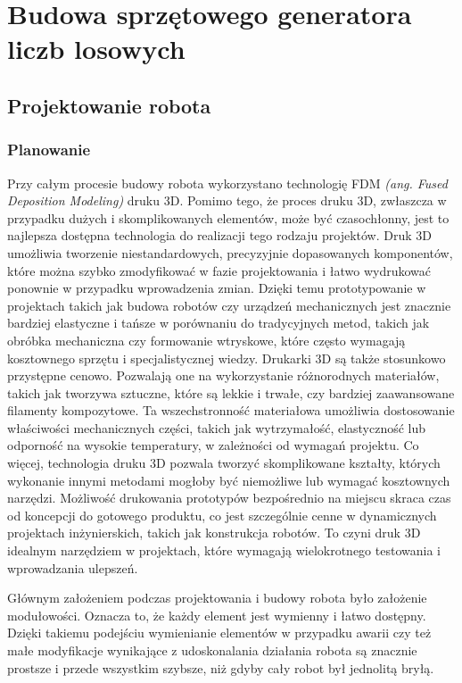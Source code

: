 
\chapter{Budowa sprzętowego generatora liczb losowych}\label{ch:budowa-sprzetowego-generatora}


\section{Projektowanie robota}\label{sec:projektowanie-robota}

\subsection{Planowanie}\label{subsec:Planowanie}

Przy całym procesie budowy robota wykorzystano technologię FDM \textit{(ang. Fused Deposition Modeling)} druku 3D. Pomimo tego, że proces druku 3D, zwłaszcza w przypadku dużych i skomplikowanych elementów, może być czasochłonny, jest to najlepsza dostępna
technologia do realizacji tego rodzaju projektów. Druk 3D umożliwia tworzenie niestandardowych, precyzyjnie dopasowanych komponentów, które można 
szybko zmodyfikować w fazie projektowania i łatwo wydrukować ponownie w przypadku wprowadzenia zmian. Dzięki temu prototypowanie w projektach takich 
jak budowa robotów czy urządzeń mechanicznych jest znacznie bardziej elastyczne i tańsze w porównaniu do tradycyjnych metod, takich jak obróbka 
mechaniczna czy formowanie wtryskowe, które często wymagają kosztownego sprzętu i specjalistycznej wiedzy.
Drukarki 3D są także stosunkowo przystępne cenowo. Pozwalają one na wykorzystanie różnorodnych materiałów, takich jak tworzywa sztuczne, które są lekkie 
i trwałe, czy bardziej zaawansowane filamenty kompozytowe. Ta wszechstronność materiałowa umożliwia dostosowanie właściwości mechanicznych części, takich 
jak wytrzymałość, elastyczność lub odporność na wysokie temperatury, w zależności od wymagań projektu.
Co więcej, technologia druku 3D pozwala tworzyć skomplikowane kształty, których wykonanie innymi metodami mogłoby być niemożliwe lub wymagać kosztownych 
narzędzi. Możliwość drukowania prototypów bezpośrednio na miejscu skraca czas od koncepcji do gotowego produktu, co jest szczególnie cenne w dynamicznych 
projektach inżynierskich, takich jak konstrukcja robotów. To czyni druk 3D idealnym narzędziem w projektach, które wymagają wielokrotnego 
testowania i wprowadzania ulepszeń.

Głównym założeniem podczas projektowania i budowy robota było założenie modułowości. Oznacza to, że każdy element jest wymienny i łatwo dostępny.
Dzięki takiemu podejściu wymienianie elementów w przypadku awarii czy też małe modyfikacje wynikające z udoskonalania działania robota
są znacznie prostsze i przede wszystkim szybsze, niż gdyby cały robot był jednolitą bryłą.

